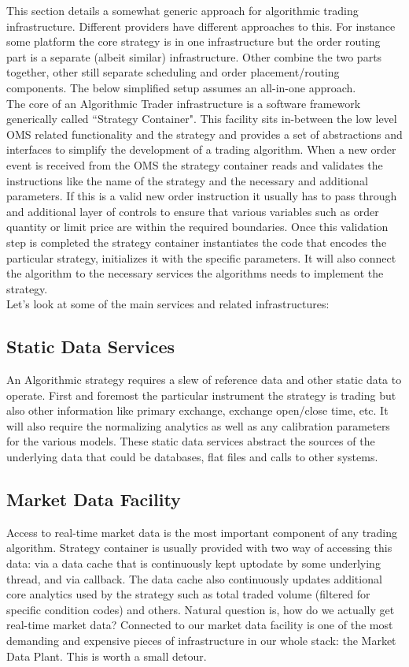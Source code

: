 This section details a somewhat generic approach for algorithmic trading infrastructure. Different providers have different approaches to this. For instance some platform the core strategy is in one infrastructure but the order routing part is a separate (albeit similar) infrastructure. Other combine the two parts together, other still separate scheduling and order placement/routing components. The below simplified setup assumes an all-in-one approach.\\

The core of an Algorithmic Trader infrastructure is a software framework generically called ``Strategy Container". This facility sits in-between the low level OMS related functionality and the strategy and provides a set of abstractions and interfaces to simplify the development of a trading algorithm.  When a new order event is received from the OMS the strategy container reads and validates the instructions like the name of the strategy and the necessary and additional parameters. If this is a valid new order instruction it usually has to pass through and additional layer of controls to ensure that various variables such as order quantity or limit price are within the required boundaries. Once this validation step is completed the strategy container instantiates the code that encodes the particular strategy, initializes it with the specific parameters. It will also connect the algorithm to the necessary services the algorithms needs to implement the strategy.\\  Let's look at some of the main services and related infrastructures:
\subsection{Static Data Services}
An Algorithmic strategy requires a slew of reference data and other static data to operate. First and foremost the particular instrument the strategy is trading but also other information like primary exchange, exchange open/close time, etc. It will also require the normalizing analytics as well as any calibration parameters for the various models. These static data services abstract the sources of the underlying data that could be databases, flat files and calls to other systems.
\subsection{Market Data Facility}
Access to real-time market data is the most important component of any trading algorithm. Strategy container is usually provided with two way of accessing this data: via a data cache that is continuously kept uptodate by some underlying thread, and via callback. The data cache also continuously updates additional core analytics used by the strategy such as total traded volume (filtered for specific condition codes) and others. Natural question is, how do we actually get real-time market data? Connected to our market data facility is one of the most demanding and expensive pieces of infrastructure in our whole stack: the Market Data Plant. This is worth a small detour.
